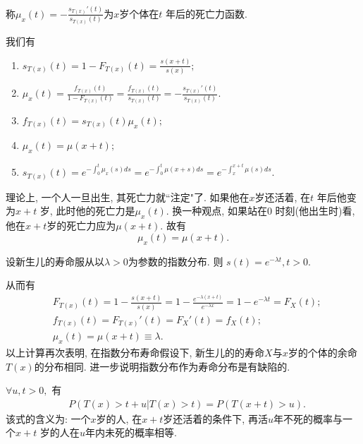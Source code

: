 \documentclass[lang=cn,10pt]{elegantbook}
\begin{document}
\begin{definition}[$x$岁个体的死亡力]
    称$\mu_x(t) = -\frac{s_{T(x)}'(t)}{s_{T(x)}(t)}$为$x$岁个体在$t$ 年后的死亡力函数.
\end{definition}

\begin{corollary}
	我们有
	\begin{enumerate}
		\item $s_{T(x)}(t)=1-F_{T(x)}(t)=\frac{s(x+t)}{s(x)};$
		\item $\mu_{x}(t)=\frac{f_{T(x)}(t)}{1-F_{T(x)}(t)}=\frac{f_{T(x)}(t)}{s_{T(x)}(t)}=-\frac{s_{T(x)}'(t)}{s_{T(x)}(t)}.$
		\item $f_{T(x)}(t)=s_{T(x)}(t)\mu_{x}(t);$
		\item $\mu_x(t)=\mu(x+t);$
		\item $s_{T(x)}(t)=e^{-\int_0^t \mu_x(s)ds}=e^{-\int_0^t \mu(x+s)ds}=e^{-\int_x^{x+t} \mu(s)ds}.$
	\end{enumerate}
\end{corollary}

\begin{remark}
    理论上, 一个人一旦出生, 其死亡力就``注定"了. 如果他在$x$岁还活着, 在$t$ 年后他变为$x+t$ 岁, 此时他的死亡力是$\mu_x(t).$ 换一种观点, 如果站在0 时刻(他出生时)看, 他在$x+t$岁的死亡力应为$\mu(x+t).$ 故有
    $$\mu_x(t)=\mu(x+t).$$
\end{remark}

\begin{example}
    设新生儿的寿命服从以$\lambda>0$为参数的指数分布. 则
    $s(t)=e^{-\lambda t}, t>0.$
\end{example}
\begin{solution}
	从而有
    \begin{align*}
         & F_{T(x)}(t)=1-\frac{s(x+t)}{s(x)}=1-\frac{e^{-\lambda(x+t)}}{e^{-\lambda x}}=1-e^{-\lambda t} =F_X(t); \\
         & f_{T(x)}(t)=F_{T(x)}'(t)=F_X'(t)=f_X(t);   \\
         & \mu_x(t)=\mu(x+t)\equiv\lambda.
    \end{align*}
    以上计算再次表明, 在指数分布寿命假设下, 新生儿的的寿命$X$与$x$岁的个体的余命$T(x)$的分布相同. 进一步说明指数分布作为寿命分布是有缺陷的.
\end{solution}

\begin{proposition}$\forall u,t>0,$ 有
    \begin{align}
         & P(T(x)>t+u|T(x)>t)=P(T(x+t)>u).\label{tu}
    \end{align}
    该式的含义为: 一个$x$岁的人, 在$x+t$岁还活着的条件下, 再活$u$年不死的概率与一个$x+t$ 岁的人在$u$年内未死的概率相等.
\end{proposition}
\end{document}
